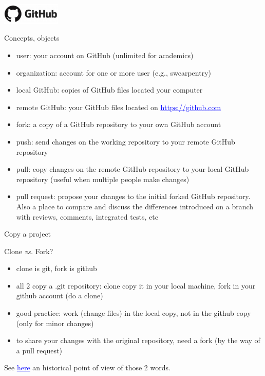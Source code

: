 \begin{frame}{\includegraphics[height=1cm]{shared/logo-github.png} }
\begin{block}{Concepts, objects}
\begin{itemize}
    \item user: your account on GitHub (unlimited for academics)
    \item organization: account for one or more user (e.g., swcarpentry)
    \item local GitHub: copies of GitHub files located your computer
    \item remote GitHub: your GitHub files located on \href{https://github.com}{\textcolor{blue}{\underline{https://github.com}}}
    \item fork: a copy of a GitHub repository to your own GitHub account
    \item push: send changes on the working repository to your remote GitHub repository
    \item pull: copy changes on the remote GitHub repository to your local GitHub repository (useful when multiple people make changes)
    \item pull request: propose your changes to the initial forked GitHub repository. Also a place to compare and discuss the differences introduced on a branch with reviews, comments, integrated tests, etc
\end{itemize}
\end{block}
\end{frame}
\begin{frame}{ Copy a project}
\begin{block}{Clone \textit{vs.} Fork?}
\begin{itemize}
    \item clone is git, fork is github
    \item all 2 copy a .git repository: clone copy it in your local machine, fork in your github account (do a clone)
    \item good practice: work (change files) in the local copy, not in the github copy (only for minor changes)
    \item to share your changes with the original repository, need a fork (by the way of a pull request)
\end{itemize}
\end{block}
See \href{https://opensource.com/article/17/12/fork-clone-difference}{\textcolor{blue}{\underline{here}}} an historical point of view of those 2 words.
\end{frame}

